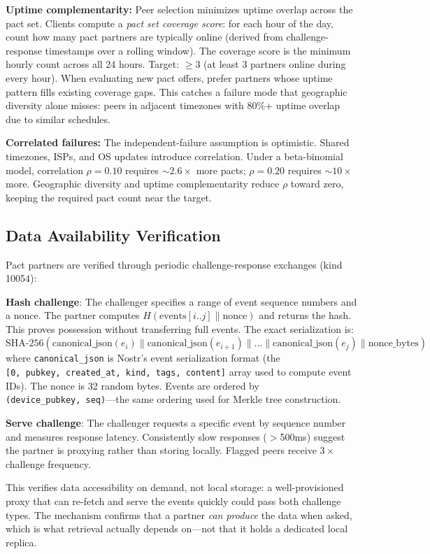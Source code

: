 \documentclass[11pt,a4paper]{article}
\begin{document}
\textbf{Uptime complementarity:} Peer selection minimizes uptime overlap across the pact set. Clients compute a \emph{pact set coverage score}: for each hour of the day, count how many pact partners are typically online (derived from challenge-response timestamps over a rolling window). The coverage score is the minimum hourly count across all 24 hours. Target: $\geq 3$ (at least 3 partners online during every hour). When evaluating new pact offers, prefer partners whose uptime pattern fills existing coverage gaps. This catches a failure mode that geographic diversity alone misses: peers in adjacent timezones with 80\%+ uptime overlap due to similar schedules.

\textbf{Correlated failures:} The independent-failure assumption is optimistic. Shared timezones, ISPs, and OS updates introduce correlation. Under a beta-binomial model, correlation $\rho = 0.10$ requires ${\sim}2.6\times$ more pacts; $\rho = 0.20$ requires ${\sim}10\times$ more. Geographic diversity and uptime complementarity reduce $\rho$ toward zero, keeping the required pact count near the target.

\subsection{Data Availability Verification}

Pact partners are verified through periodic challenge-response exchanges (kind 10054):

\textbf{Hash challenge}: The challenger specifies a range of event sequence numbers and a nonce. The partner computes $H(\text{events}[i..j] \| \text{nonce})$ and returns the hash. This proves possession without transferring full events. The exact serialization is: $\text{SHA-256}(\text{canonical\_json}(e_i) \| \text{canonical\_json}(e_{i+1}) \| \ldots \| \text{canonical\_json}(e_j) \| \text{nonce\_bytes})$ where \texttt{canonical\_json} is Nostr's event serialization format (the \texttt{[0,~pubkey,~created\_at,~kind,~tags,~content]} array used to compute event IDs). The nonce is 32 random bytes. Events are ordered by \texttt{(device\_pubkey,~seq)}---the same ordering used for Merkle tree construction.

\textbf{Serve challenge}: The challenger requests a specific event by sequence number and measures response latency. Consistently slow responses ($>$500ms) suggest the partner is proxying rather than storing locally. Flagged peers receive $3\times$ challenge frequency.

This verifies data accessibility on demand, not local storage: a well-provisioned proxy that can re-fetch and serve the events quickly could pass both challenge types. The mechanism confirms that a partner \emph{can produce} the data when asked, which is what retrieval actually depends on---not that it holds a dedicated local replica.
\end{document}
